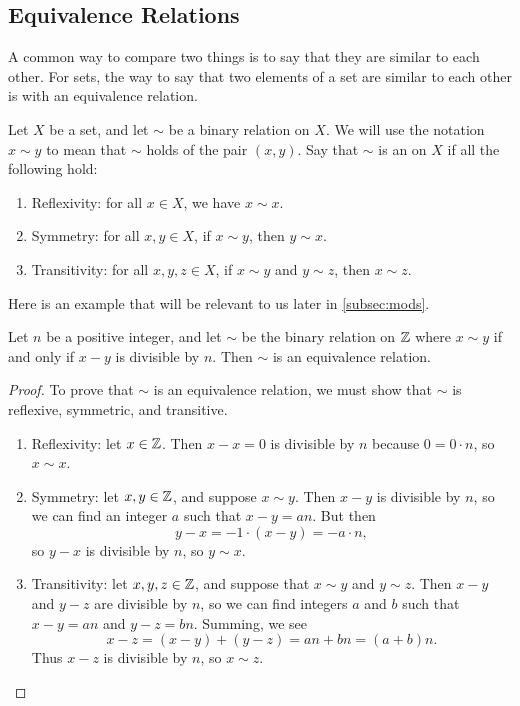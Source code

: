 \documentclass[../main.tex]{subfiles}
\begin{document}
\subsection{Equivalence Relations}
A common way to compare two things is to say that they are similar to each other. For sets, the way to say that two elements of a set are similar to each other is with an equivalence relation.
\begin{definition}
    Let $X$ be a set, and let $\sim$ be a binary relation on $X$. We will use the notation $x \sim y$ to mean that $\sim$ holds of the pair $(x, y)$. Say that $\sim$ is an  on $X$ if all the following hold:
    \begin{enumerate}[label=(\alph*)]
        \item Reflexivity: for all $x \in X$, we have $x \sim x$.
        \item Symmetry: for all $x, y \in X$, if $x \sim y$, then $y \sim x$.
        \item Transitivity: for all $x, y, z \in X$, if $x \sim y$ and $y \sim z$, then $x \sim z$.
    \end{enumerate}
\end{definition}
Here is an example that will be relevant to us later in \cref{subsec:mods}.
\begin{prop} \label{prop:mods-equiv-relation}
    Let $n$ be a positive integer, and let $\sim$ be the binary relation on $\mathbb Z$ where $x \sim y$ if and only if $x-y$ is divisible by $n$. Then $\sim$ is an equivalence relation.
\end{prop}
\begin{proof}
    To prove that $\sim$ is an equivalence relation, we must show that $\sim$ is reflexive, symmetric, and transitive.
    \begin{enumerate}[label=(\alph*)]
        \item Reflexivity: let $x \in \mathbb Z$. Then $x-x=0$ is divisible by $n$ because $0=0\cdot n$, so $x\sim x$.
        \item Symmetry: let $x, y \in \mathbb Z$, and suppose $x \sim y$. Then $x-y$ is divisible by $n$, so we can find an integer $a$ such that $x-y=an$. But then
        \[y-x=-1\cdot(x-y)=-a\cdot n,\]
        so $y-x$ is divisible by $n$, so $y\sim x$.
        \item Transitivity: let $x, y, z \in \mathbb Z$, and suppose that $x \sim y$ and $y \sim z$. Then $x-y$ and $y-z$ are divisible by $n$, so we can find integers $a$ and $b$ such that $x-y=an$ and $y-z=bn$. Summing, we see
        \[x-z=(x-y)+(y-z)=an+bn=(a+b)n.\]
        Thus $x-z$ is divisible by $n$, so $x\sim z$.
        \qedhere
    \end{enumerate}
\end{proof}
\end{document}
